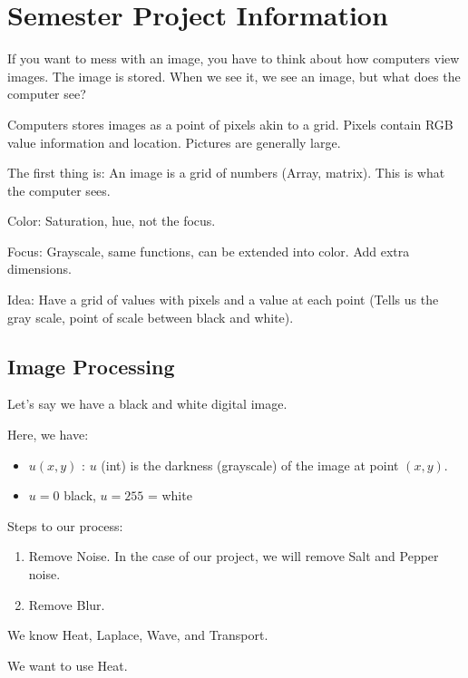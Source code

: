 \newpage
\section{Semester Project Information}

If you want to mess with an image, you have to think about how computers view images. The image is stored. When we see it, we see an image, but what does the computer see?

Computers stores images as a point of pixels akin to a grid. Pixels contain RGB value information and location. Pictures are generally large.

The first thing is: An image is a grid of numbers (Array, matrix). This is what the computer sees.

Color: Saturation, hue, not the focus.

Focus: Grayscale, same functions, can be extended into color. Add extra dimensions.

Idea: Have a grid of values with pixels and a value at each point (Tells us the gray scale, point of scale between black and white).

\bigbreak

\subsection{Image Processing}

Let's say we have a black and white digital image.


Here, we have:

\begin{itemize}
  \item $u(x, y)$ : $u$ (int) is the darkness (grayscale) of the image at point $(x, y)$.
  \item $u = 0$ black, $u = 255$ = white
\end{itemize}

Steps to our process:
%
\begin{enumerate}
  \item Remove Noise. In the case of our project, we will remove Salt and Pepper noise.
  \item Remove Blur.
\end{enumerate}

We know Heat, Laplace, Wave, and Transport.

We want to use Heat.


